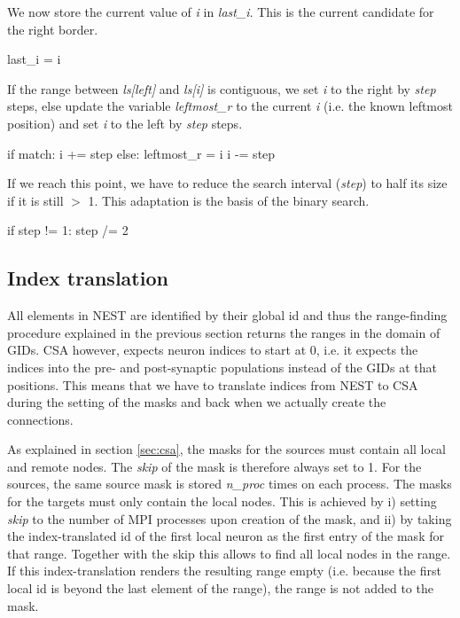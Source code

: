 \documentclass{frontiersSCNS} %
\begin{document}
We now store the current value of \emph{i} in \emph{last\_i}. This is
the current candidate for the right border.

\begin{pythoncode}
        last_i = i 
\end{pythoncode}

If the range between \emph{ls[left]} and \emph{ls[i]} is contiguous, we
set \emph{i} to the right by \emph{step} steps, else update the
variable \emph{leftmost\_r} to the current \emph{i} (i.e. the known
leftmost position) and set \emph{i} to the left by \emph{step} steps.

\begin{pythoncode}
        if match:
            i += step
        else:
            leftmost_r = i
            i -= step
\end{pythoncode}

If we reach this point, we have to reduce the search interval
(\emph{step}) to half its size if it is still $>$ 1. This adaptation
is the basis of the binary search.

\begin{pythoncode}
        if step != 1:
            step /= 2
\end{pythoncode}

\subsection*{Index translation}

All elements in NEST are identified by their global id and thus the
range-finding procedure explained in the previous section returns the
ranges in the domain of GIDs. CSA however, expects neuron indices to
start at 0, i.e. it expects the indices into the pre- and
post-synaptic populations instead of the GIDs at that positions. This
means that we have to translate indices from NEST to CSA during the
setting of the masks and back when we actually create the connections.

As explained in section \ref{sec:csa}, the masks for the sources must
contain all local and remote nodes. The \emph{skip} of the mask is
therefore always set to 1. For the sources, the same source mask is
stored \emph{n\_proc} times on each process. The masks for the targets
must only contain the local nodes. This is achieved by i) setting
\emph{skip} to the number of MPI processes upon creation of the mask,
and ii) by taking the index-translated id of the first local neuron as
the first entry of the mask for that range. Together with the skip
this allows to find all local nodes in the range. If this
index-translation renders the resulting range empty (i.e. because the
first local id is beyond the last element of the range), the range is
not added to the mask.
\end{document}

